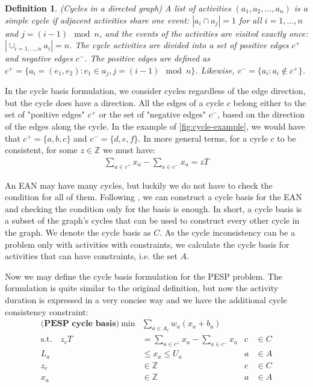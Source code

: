 \documentclass[english, 12pt, a4paper, sci, utf8, a-2b, online]{aaltothesis}
\newtheorem{definition}{Definition}
\newcommand{\Z}{\mathbb{Z}}
\newcommand{\Ar}{A_\text{r}}
\begin{document}
\begin{definition}{(Cycles in a directed graph)}
    A list of activities $(a_1, a_2, \dots, a_n)$ is a simple cycle if 
    adjacent activities share one event: $|a_i\cap a_{j}| = 1$ for all $i = {1, \dots, n}$ and $j = (i - 1 ) \mod n$, and the events of the activities are visited exactly once: $|\cup_{i=1,\dots, n}a_i| = n$. The cycle activities are divided into a set of positive edges $c^+$ and negative edges $c^-$. The positive edges are defined as $c^+ = \{a_i = (e_1, e_2) : e_1 \in a_j, j = (i - 1) \mod n\}$. Likewise, $c^- = \{a_i : a_i \notin c^+\}$.
\end{definition}

In the cycle basis formulation, we consider cycles regardless of the edge direction, but the cycle does have a direction. All the edges of a cycle $c$ belong either to the set of "positive edges" $c^+$ or the set of "negative edges" $c^-$, based on the direction of the edges along the cycle. In the example of \cref{fig:cycle-example}, we would have that $c^+ = \{a, b, c\}$ and $c^- = \{d, e, f\}$. In more general terms, for a cycle $c$ to be consistent, for some $z \in \Z$ we must have:
\begin{align}
    \sum_{a\in c^+}x_a - \sum_{a \in c^-}x_a = zT
\end{align}

An EAN may have many cycles, but luckily we do not have to check the condition for all of them. Following \cite{cycle-basis-original-2001}, we can construct a cycle basis for the EAN and checking the condition only for the basis is enough. In short, a cycle basis is a subset of the graph's cycles that can be used to construct every other cycle in the graph. We denote the cycle basis as $C$. As the cycle inconsistency can be a problem only with activities with constraints, we calculate the cycle basis for activities that can have constraints, i.e. the set $A$.



Now we may define the cycle basis formulation for the PESP problem. The formulation is quite similar to the original definition, but now the activity duration is expressed in a very concise way and we have the additional cycle consistency constraint:
\begin{align}
    \textbf{(PESP cycle basis)}\ \min &  \sum_{a \in \Ar} w_{a} (x_a + b_a) \\
    \textrm{s.t.} \quad  z_c T &= \sum_{a\in c^+} x_a - \sum_{a\in c^-} x_a &c &\in C \\
    L_a &\leq x_a  \leq U_a &a &\in A \\
    z_c &\in \Z &c& \in C \\
    x_a &\in \Z &a& \in A
\end{align}
\end{document}
